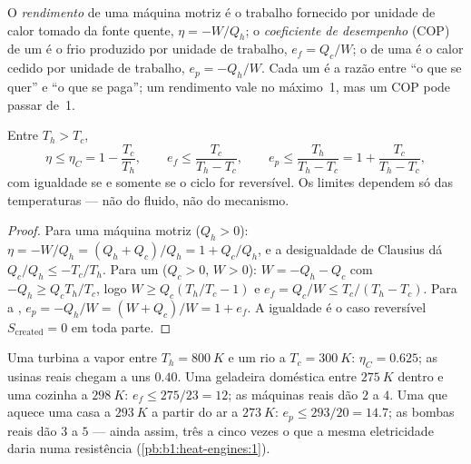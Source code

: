 \begin{definition}\label{def:b1:heat-engines:efficiency}
O \emph{rendimento} de uma máquina motriz é o trabalho fornecido por
unidade de calor tomado da fonte quente, $\eta = -W/Q_h$; o
\emph{coeficiente de desempenho} (COP) de um  é o frio
produzido por unidade de trabalho, $e_f = Q_c/W$; o de uma  é
o calor cedido por unidade de trabalho, $e_p = -Q_h/W$. Cada um é a razão
entre ``o que se quer'' e ``o que se paga''; um rendimento vale no máximo~1,
mas um COP pode passar de~1.
\end{definition}

\begin{theorem}[Carnot]\label{thm:b1:heat-engines:carnot}
Entre  $T_h > T_c$,
\[
\eta \leq \eta_C = 1 - \frac{T_c}{T_h}, \qquad
e_f \leq \frac{T_c}{T_h - T_c}, \qquad
e_p \leq \frac{T_h}{T_h - T_c} = 1 + \frac{T_c}{T_h - T_c},
\]
com igualdade se e somente se o ciclo for reversível. Os limites dependem
só das temperaturas --- não do fluido, não do mecanismo.
\end{theorem}

\begin{proof}
Para uma máquina motriz ($Q_h > 0$): $\eta = -W/Q_h = (Q_h + Q_c)/Q_h = 1 + Q_c/Q_h$,
e a desigualdade de Clausius dá $Q_c/Q_h \leq -T_c/T_h$. Para um
 ($Q_c > 0$, $W > 0$): $W = -Q_h - Q_c$ com $-Q_h \geq Q_c T_h/T_c$,
logo $W \geq Q_c(T_h/T_c - 1)$ e $e_f = Q_c/W \leq T_c/(T_h - T_c)$.
Para a , $e_p = -Q_h/W = (W + Q_c)/W = 1 + e_f$. A igualdade é
o caso reversível $S_{\mathrm{created}} = 0$ em toda parte.
\end{proof}

\begin{example}\label{ex:b1:heat-engines:numbers}
Uma turbina a vapor entre $T_h = \qty{800}{K}$ e um rio a
$T_c = \qty{300}{K}$: $\eta_C = 0.625$; as usinas reais chegam a uns $0.40$.
Uma geladeira doméstica entre $\qty{275}{K}$ dentro e uma cozinha a
$\qty{298}{K}$: $e_f \leq 275/23 = 12$; as máquinas reais dão $2$ a $4$. Uma
 que aquece uma casa a $\qty{293}{K}$ a partir do ar a $\qty{273}{K}$:
$e_p \leq 293/20 = 14.7$; as bombas reais dão $3$ a $5$ --- ainda assim, três a
cinco vezes o que a mesma eletricidade daria numa resistência
(\cref{pb:b1:heat-engines:1}).
\end{example}

